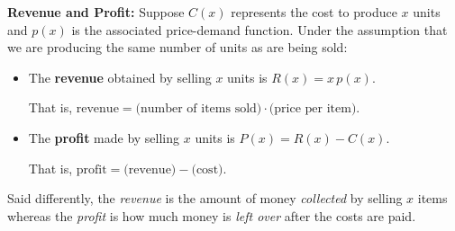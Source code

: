 \colorbox{ResultColor}{\bbm

\begin{defn}  \textbf{Revenue and Profit:}  Suppose $C(x)$ represents the cost to produce $x$ units and $p(x)$ is the associated price-demand function.  Under the assumption that we are producing the same number of units as are being sold: \label{revenueprofitdefns}   

\begin{itemize}

\item The  \textbf{revenue} obtained by selling $x$ units is $R(x) = x \, p(x)$.

That is, $\text{revenue} = \text{(number of items sold)} \cdot \text{(price per item)}.$

\item The  \textbf{profit} made by selling $x$ units is $P(x) = R(x) - C(x)$.

That is, $\text{profit} = \text{(revenue)}  - \text{(cost)}.$

\end{itemize}

\end{defn}

\ebm}

\medskip

Said differently, the \textit{revenue} is the amount of money \textit{collected} by selling $x$ items whereas the \textit{profit} is how much money is \textit{left over} after the costs are paid.
 
